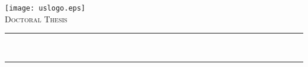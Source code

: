 \begin{titlepage}

		\begin{center}











			\texttt{[image: uslogo.eps]} \\ \medskip
			\vspace*{.05\textheight}
			\textsc{\Large Doctoral Thesis}\\%

			\rule{.9\linewidth}{.6pt}\\[0.4cm]
			{\huge \myTitle \par}\vspace{0.4cm} %
			\rule{.9\linewidth}{.6pt}\\[1cm] 


\end{center}
\end{titlepage}
